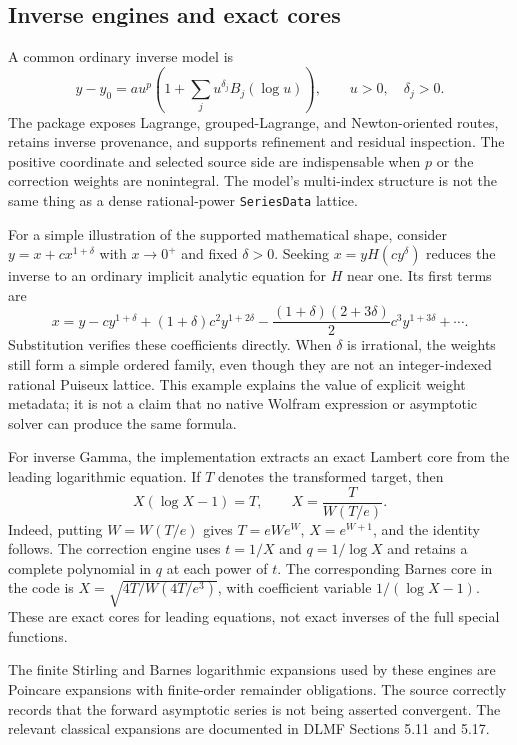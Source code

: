 \documentclass[11pt,letterpaper]{article}
\newcommand{\code}[1]{\nolinkurl{#1}}
\begin{document}
\subsection{Inverse engines and exact cores}
A common ordinary inverse model is
\begin{equation}
 y-y_0=a u^p\left(1+\sum_j u^{\delta_j}B_j(\log u)\right),
 \qquad u>0,\quad \delta_j>0.
\end{equation}
The package exposes Lagrange, grouped-Lagrange, and Newton-oriented routes,
retains inverse provenance, and supports refinement and residual inspection.
The positive coordinate and selected source side are indispensable when $p$ or
the correction weights are nonintegral. The model's multi-index structure is
not the same thing as a dense rational-power \code{SeriesData} lattice.
\cite{main,kernelmap,readme}

For a simple illustration of the supported mathematical shape, consider
$y=x+c x^{1+\delta}$ with $x\to0^+$ and fixed $\delta>0$. Seeking $x=yH(cy^\delta)$
reduces the inverse to an ordinary implicit analytic equation for $H$ near one.
Its first terms are
\begin{equation}\label{eq:irrationalinverse}
 x=y-cy^{1+\delta}+(1+\delta)c^2y^{1+2\delta}
 -\frac{(1+\delta)(2+3\delta)}2c^3y^{1+3\delta}+\cdots.
\end{equation}
Substitution verifies these coefficients directly. When $\delta$ is irrational,
the weights still form a simple ordered family, even though they are not an
integer-indexed rational Puiseux lattice. This example explains the value of
explicit weight metadata; it is not a claim that no native Wolfram expression
or asymptotic solver can produce the same formula.

For inverse Gamma, the implementation extracts an exact Lambert core from the
leading logarithmic equation. If $T$ denotes the transformed target, then
\begin{equation}
 X(\log X-1)=T,
 \qquad X=\frac{T}{W(T/e)}.
\end{equation}
Indeed, putting $W=W(T/e)$ gives $T=eW e^W$, $X=e^{W+1}$, and the identity follows.
The correction engine uses $t=1/X$ and $q=1/\log X$ and retains a complete
polynomial in $q$ at each power of $t$. The corresponding Barnes core in the
code is $X=\sqrt{4T/W(4T/e^3)}$, with coefficient variable
$1/(\log X-1)$. These are exact cores for leading equations, not exact inverses
of the full special functions.~\cite{gamma}

The finite Stirling and Barnes logarithmic expansions used by these engines
are Poincare expansions with finite-order remainder obligations. The source
correctly records that the forward asymptotic series is not being asserted
convergent. The relevant classical expansions are documented in DLMF
Sections 5.11 and 5.17.~\cite{dlmf-gamma,dlmf-barnes,gamma}
\end{document}
